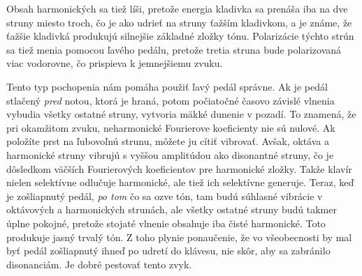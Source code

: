 Obsah harmonických sa tiež líši, pretože energia kladivka sa prenáša iba na dve struny miesto troch, čo je ako udrieť na struny ťažším kladivkom, a je známe, že ťažšie kladivká produkujú silnejšie základné zložky tónu. Polarizácie týchto strún sa tiež menia pomocou ľavého pedálu, pretože tretia struna bude polarizovaná viac vodorovne, čo prispieva k jemnejšiemu zvuku.

Tento typ pochopenia nám pomáha použiť ľavý pedál správne. Ak je pedál stlačený \textit{pred} notou, ktorá je hraná, potom počiatočné časovo závislé vlnenia vybudia všetky ostatné struny, vytvoria mäkké dunenie v pozadí. To znamená, že pri okamžitom zvuku, neharmonické Fourierove koeficienty nie sú nulové. Ak položíte prst na ľubovoľnú strunu, môžete ju cítiť vibrovať. Avšak, oktáva a harmonické struny vibrujú s vyššou amplitúdou ako disonantné struny, čo je dôsledkom väčších Fourierových koeficientov pre harmonické zložky. Takže klavír nielen selektívne odlučuje harmonické, ale tiež ich selektívne generuje. Teraz, keď je zošliapnutý pedál, \textit{po tom} čo sa ozve tón, tam budú súhlasné vibrácie v oktávových a harmonických strunách, ale všetky ostatné struny budú takmer úplne pokojné, pretože stojaté vlnenie obsahuje iba čisté harmonické. Toto produkuje jasný trvalý tón. Z toho plynie ponaučenie, že vo všeobecnosti by mal byť pedál zošliapnutý ihneď po udretí do klávesu, nie skôr, aby sa zabránilo disonanciám. Je dobré pestovať tento zvyk.


